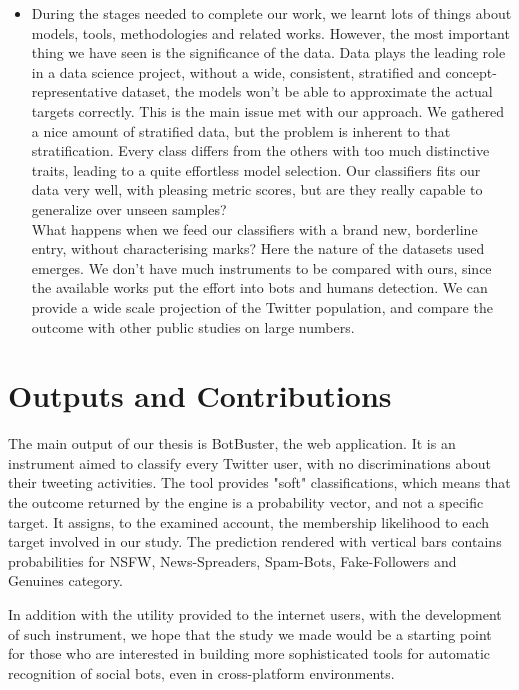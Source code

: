 \begin{itemize}
\item[\PencilRight] During the stages needed to complete our work, we learnt lots of things about models, tools, methodologies and related works. However, the most important thing we have seen is the significance of the data. Data plays the leading role in a data science project, without a wide, consistent, stratified and concept-representative dataset, the models won't be able to approximate the actual targets correctly. This is the main issue met with our approach.
We gathered a nice amount of stratified data, but the problem is inherent to that stratification. Every class differs from the others with too much distinctive traits, leading to a quite effortless model selection. Our classifiers fits our data very well, with pleasing metric scores, but are they really capable to generalize over unseen samples?\\
What happens when we feed our classifiers with a brand new, borderline entry, without characterising marks? Here the nature of the datasets used emerges. We don't have much instruments to be compared with ours, since the available works put the effort into bots and humans detection. We can provide a wide scale projection of the Twitter population, and compare the outcome with other public studies on large numbers.
\end{itemize}


\section{Outputs and Contributions}
The main output of our thesis is BotBuster, the web application. It is an instrument aimed to classify every Twitter user, with no discriminations about their tweeting activities. The tool provides "soft" classifications, which means that the outcome returned by the engine is a probability vector, and not a specific target. It assigns, to the examined account, the membership likelihood to each target involved in our study.
The prediction rendered with vertical bars contains probabilities for NSFW, News-Spreaders, Spam-Bots, Fake-Followers and Genuines category.

In addition with the utility provided to the internet users, with the development of such instrument, we hope that the study we made would be a starting point for those who are interested in building more sophisticated tools for automatic recognition of social bots, even in cross-platform environments.

